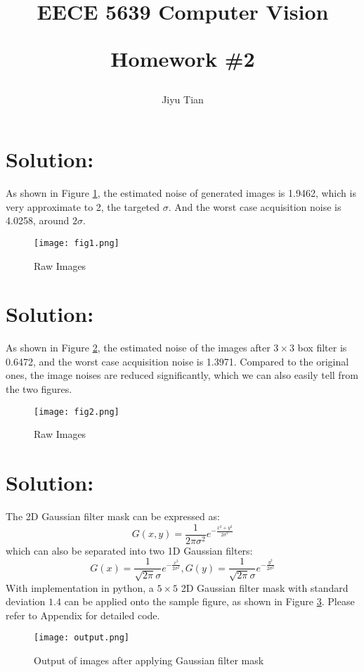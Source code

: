 \documentclass[12pt]{article}
\title{EECE 5639 Computer Vision\\ [2ex] \begin{large} Homework \#2 \end{large} }
\author{Jiyu Tian}
\date{}
\begin{document}
\maketitle
\section{Solution:}
As shown in Figure \ref{raw}, the estimated noise of generated images is 1.9462, which is very approximate to 2, the targeted $\sigma$. And the worst case acquisition noise is 4.0258, around $2\sigma$.
\begin{figure}[H]
\centering
\texttt{[image: fig1.png]}
\caption{Raw Images}
\label{raw}
\end{figure}
\section{Solution:}
As shown in Figure \ref{filtered}, the estimated noise of the images after $3\times3$ box filter is 0.6472, and the worst case acquisition noise is 1.3971. Compared to the original ones, the image noises are reduced significantly, which we can also easily tell from the two figures.
\begin{figure}[H]
\centering
\texttt{[image: fig2.png]}
\caption{Raw Images}
\label{filtered}
\end{figure}
\section{Solution:}
The 2D Gaussian filter mask can be expressed as:
\begin{equation*}
    G(x,y) = \frac{1}{2\pi\sigma^2}e^{-\frac{x^2+y^2}{2\sigma^2}}
\end{equation*}
which can also be separated into two 1D Gaussian filters:
\begin{equation*}
    G(x) = \frac{1}{\sqrt{2\pi}\sigma}e^{-\frac{x^2}{2\sigma^2}}, G(y) = \frac{1}{\sqrt{2\pi}\sigma}e^{-\frac{y^2}{2\sigma^2}}
\end{equation*}
With implementation in python, a $5\times 5$ 2D Gaussian filter mask with standard deviation $1.4$ can be applied onto the sample figure, as shown in Figure \ref{ouput}. Please refer to Appendix for detailed code.
\begin{figure}[H]
\centering
\texttt{[image: output.png]}
\caption{Output of images after applying Gaussian filter mask}
\label{ouput}
\end{figure}
\end{document}
